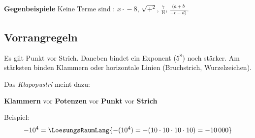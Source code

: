 \textbf{Gegenbeispiele}
Keine Terme sind \zB{}: $x \cdot{}-8$, $\sqrt{+^2}$, $\frac{7}{\mathbb{N}}$, $\frac{(a+b}{-c-d)}$.


\newpage

\subsection{Vorrangregeln}

Es gilt Punkt vor Strich. Daneben bindet ein Exponent (\zB $5^8$) noch
stärker. Am stärksten binden Klammern oder horizontale Linien
(Bruchstrich, Wurzelzeichen).

\begin{center}
  Das \textit{Klapopustri} meint dazu:

  \textbf{Klammern} vor \textbf{Potenzen} vor \textbf{Punkt} vor
  \textbf{Strich}
  
\end{center}


Beispiel:
$$-10^4 = \LoesungsRaumLang{-(10^4) = -
  (10\cdot{}10\cdot{}10\cdot{}10) = -10\,000}$$






